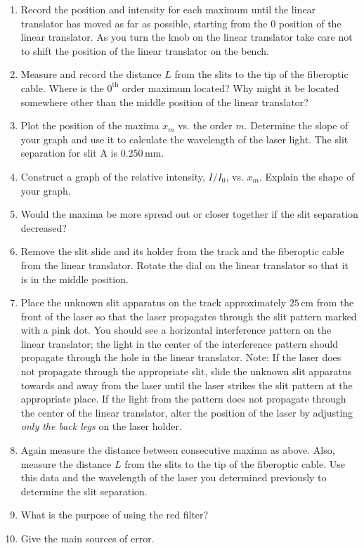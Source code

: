 \begin{enumerate}
\item Record the position and intensity for each maximum until the linear translator has moved as far as possible, starting from the 0 position of the linear translator. As you turn the knob on the linear translator take care not to shift the position of the linear translator on the bench.

\item Measure and record the distance $L$ from the slits to the tip of the fiberoptic cable. Where is the $0^{\mathrm{th}}$ order maximum located? Why might it be located somewhere other than the middle position of the linear translator?

\item Plot the position of the maxima $x_{m}$ vs. the order $m$. Determine the slope of your graph and use it to calculate the wavelength of the laser light. The slit separation for slit A is $0.250\, \mathrm{mm}$.

\item Construct a graph of the relative intensity, $I/I_{0}$, vs. $x_{m}$. Explain the shape of your graph.

\item Would the maxima be more spread out or closer together if the slit separation decreased?

\item Remove the slit slide and its holder from the track and the fiberoptic cable from the linear translator. Rotate the dial on the linear translator so that it is in the middle position.

\item Place the unknown slit apparatus on the track approximately $25\,\mathrm{cm}$ from the front of the laser so that the laser propagates through the slit pattern marked with a pink dot. You should see a horizontal interference pattern on the linear translator; the light in the center of the interference pattern should propagate through the hole in the linear translator. Note: If the laser does not propagate through the appropriate slit, slide the unknown slit apparatus towards and away from the laser until the laser strikes the slit pattern at the appropriate place. If the light from the pattern does not propagate through the center of the linear translator, alter the position of the laser by adjusting \emph{only the back legs} on the laser holder.

\item Again measure the distance between consecutive maxima as above. Also, measure the distance $L$ from the slits to the tip of the fiberoptic cable. Use this data and the wavelength of the laser you determined previously to determine the slit separation.

\item What is the purpose of using the red filter?

\item Give the main sources of error.
\end{enumerate}

